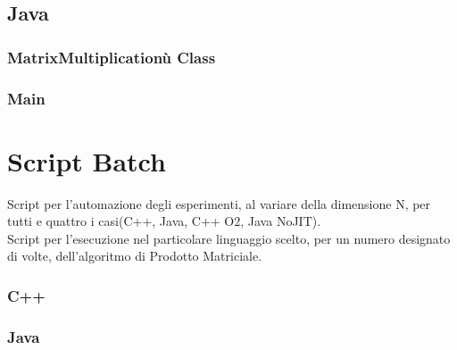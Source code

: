\subsection{Java}
\subsubsection{MatrixMultiplicationù Class}

\subsubsection{Main}


\clearpage

\section{Script Batch}
Script per l'automazione degli esperimenti, al variare della
dimensione N, per tutti e quattro i casi(C++, Java, C++ O2, Java NoJIT).\\


\clearpage
Script per l'esecuzione nel particolare linguaggio scelto, per un numero
designato di volte, dell'algoritmo di Prodotto Matriciale.\\
\subsubsection{C++}

\subsubsection{Java}

